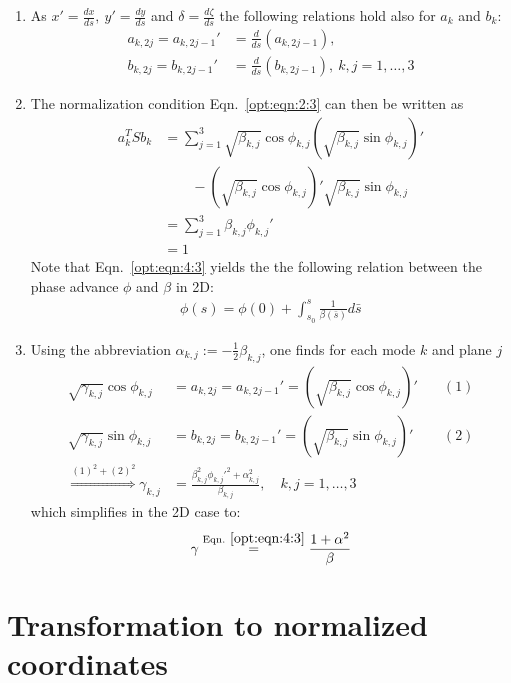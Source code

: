 \begin{enumerate}
\item As $x'=\frac{dx}{ds},\ y'=\frac{dy}{ds}$ and $\delta=\frac{d\zeta}{ds}$ the following relations hold also for $a_k$ and $b_k$:
\begin{align}
a_{k,2j}=a_{k,2j-1}'&=\frac{d}{ds}(a_{k,2j-1}), \\
b_{k,2j}=b_{k,2j-1}'&=\frac{d}{ds}(b_{k,2j-1}),\ k,j=1,\ldots,3 
\end{align}
\item The normalization condition Eqn.~\ref{opt:eqn:2:3} can then be written as
\begin{align}
a_k^TSb_k&=\sum_{j=1}^3\sqrt{\beta_{k,j}}\cos{\phi_{k,j}}\left(\sqrt{\beta_{k,j}}\sin{\phi_{k,j}}\right)'\nonumber\\
& \qquad -\left(\sqrt{\beta_{k,j}}\cos{\phi_{k,j}}\right)'\sqrt{\beta_{k,j}}\sin{\phi_{k,j}}\nonumber\\
&=\sum_{j=1}^3\beta_{k,j}\phi_{k,j}'\nonumber\\
&=1 \label{opt:eqn:4:3}
\end{align}
Note that Eqn.~\ref{opt:eqn:4:3} yields the the following relation between the phase advance $\phi$ and $\beta$ in 2D:
\begin{align}
\phi(s)=\phi(0)+\int_{s_0}^s\frac{1}{\beta(\bar s)}d\bar s
\end{align}
\item Using the abbreviation $\alpha_{k,j}:=-\frac{1}{2}\beta_{k,j}$, one finds for each mode $k$ and plane $j$
\begin{align}
\sqrt{\gamma_{k,j}}\cos{\phi_{k,j}}&=a_{k,2j}=a_{k,2j-1}'=(\sqrt{\beta_{k,j}}\cos{\phi_{k,j}})' &\quad (1)\nonumber\\
\sqrt{\gamma_{k,j}}\sin{\phi_{k,j}}&=b_{k,2j}=b_{k,2j-1}'=(\sqrt{\beta_{k,j}}\sin{\phi_{k,j}})' &\quad (2)\nonumber\\
\overset{(1)^2+(2)^2}{\Rightarrow} \gamma_{k,j}&=\frac{\beta_{k,j}^2\phi_{k,j}'^2+\alpha_{k,j}^2}{\beta_{k,j}}, \quad k,j=1,\ldots,3 &
\end{align}
which simplifies in the 2D case to:
\begin{align}
\gamma\overset{\rm Eqn.~\ref{opt:eqn:4:3}}{=}\frac{1+\alpha^2}{\beta}
\end{align}
\end{enumerate}

\section{Transformation to normalized coordinates}

